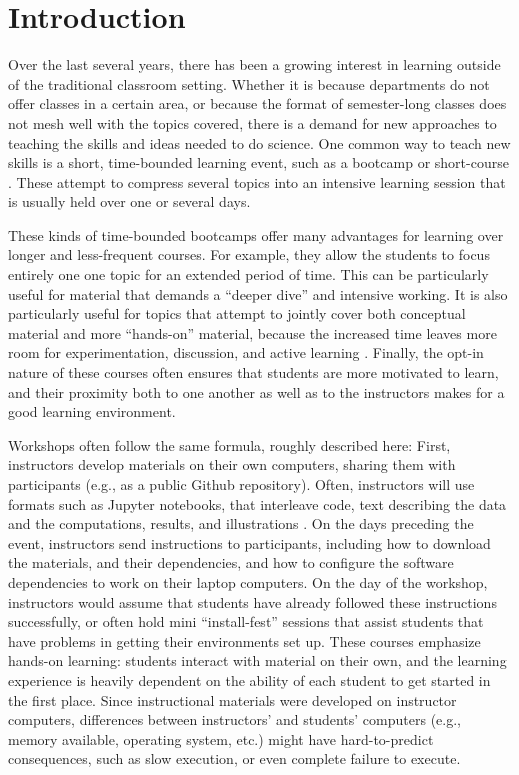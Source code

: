 \section{Introduction}

Over the last several years, there has been a growing interest in learning
outside of the traditional classroom setting. Whether it is because departments
do not offer classes in a certain area, or because the format of semester-long
classes does not mesh well with the topics covered, there is a demand for new
approaches to teaching the skills and ideas needed to do science. One common way
to teach new skills is a short, time-bounded learning event, such as a bootcamp
or short-course \cite{wilson2016software}. These attempt to compress several
topics into an intensive learning session that is usually held over one or
several days.

These kinds of time-bounded bootcamps offer many advantages for learning over
longer and less-frequent courses. For example, they allow the students to focus
entirely one one topic for an extended period of time. This can be particularly
useful for material that demands a ``deeper dive'' and intensive working. It is
also particularly useful for topics that attempt to jointly cover both
conceptual material and more ``hands-on'' material, because the increased time
leaves more room for experimentation, discussion, and active learning
\citep{Bransford2000-lu, Papert1980-fh}. Finally, the opt-in nature of these
courses often ensures that students are more motivated to learn, and their
proximity both to one another as well as to the instructors makes for a good
learning environment.

Workshops often follow the same formula, roughly described here: First,
instructors develop materials on their own computers, sharing them with
participants (e.g., as a public Github repository). Often, instructors will use
formats such as Jupyter notebooks, that interleave code, text describing the
data and the computations, results, and illustrations
\cite{kluyver2016jupyter}. On the days preceding the event, instructors send
instructions to participants, including how to download the materials, and their
dependencies, and how to configure the software dependencies to work on their
laptop computers. On the day of the workshop, instructors would assume that
students have already followed these instructions successfully, or often hold
mini ``install-fest'' sessions that assist students that have problems in
getting their environments set up. These courses emphasize hands-on learning:
students interact with material on their own, and the learning experience is
heavily dependent on the ability of each student to get started in the first
place. Since instructional materials were developed on instructor computers,
differences between instructors' and students' computers (e.g., memory
available, operating system, etc.) might have hard-to-predict consequences, such
as slow execution, or even complete failure to execute.

